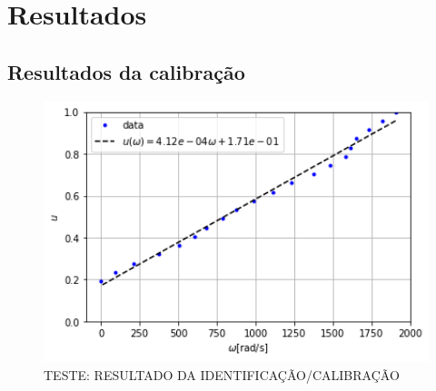 \chapter[Resultados]{Resultados}
\label{ch:resultados}




\section{Resultados da calibração}

\begin{figure}[H]
    \centering
    \includegraphics[width=13cm]{figuras/resultados/plot_test_calibration_result_feedforward.png}
    \caption{TESTE: RESULTADO DA IDENTIFICAÇÃO/CALIBRAÇÃO}
\end{figure}

